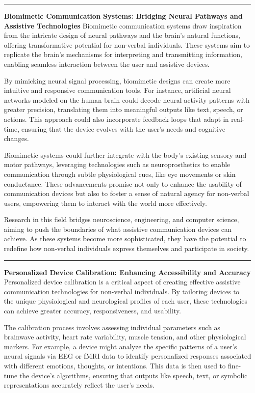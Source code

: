 \documentclass[12pt, research paper]{report}
\begin{document}
	\noindent \rule{13.85cm}{0.01cm}
	\textbf{Biomimetic Communication Systems: Bridging Neural Pathways and Assistive Technologies}
	\newline Biomimetic communication systems draw inspiration from the intricate design of neural pathways and the brain’s natural functions, offering transformative potential for non-verbal individuals. These systems aim to replicate the brain's mechanisms for interpreting and transmitting information, enabling seamless interaction between the user and assistive devices.
	\bigskip 
	
	\noindent By mimicking neural signal processing, biomimetic designs can create more intuitive and responsive communication tools. For instance, artificial neural networks modeled on the human brain could decode neural activity patterns with greater precision, translating them into meaningful outputs like text, speech, or actions. This approach could also incorporate feedback loops that adapt in real-time, ensuring that the device evolves with the user’s needs and cognitive changes.
	\bigskip 
	
	\noindent Biomimetic systems could further integrate with the body’s existing sensory and motor pathways, leveraging technologies such as neuroprosthetics to enable communication through subtle physiological cues, like eye movements or skin conductance. These advancements promise not only to enhance the usability of communication devices but also to foster a sense of natural agency for non-verbal users, empowering them to interact with the world more effectively.
	\bigskip 
	
	\noindent Research in this field bridges neuroscience, engineering, and computer science, aiming to push the boundaries of what assistive communication devices can achieve. As these systems become more sophisticated, they have the potential to redefine how non-verbal individuals express themselves and participate in society.
	
	\noindent \rule{13.85cm}{0.01cm}
	\textbf{Personalized Device Calibration: Enhancing Accessibility and Accuracy}
	\newline Personalized device calibration is a critical aspect of creating effective assistive communication technologies for non-verbal individuals. By tailoring devices to the unique physiological and neurological profiles of each user, these technologies can achieve greater accuracy, responsiveness, and usability.
	\bigskip 
	
	\noindent The calibration process involves assessing individual parameters such as brainwave activity, heart rate variability, muscle tension, and other physiological markers. For example, a device might analyze the specific patterns of a user’s neural signals via EEG or fMRI data to identify personalized responses associated with different emotions, thoughts, or intentions. This data is then used to fine-tune the device's algorithms, ensuring that outputs like speech, text, or symbolic representations accurately reflect the user’s needs.
	\bigskip 
	
\end{document}
